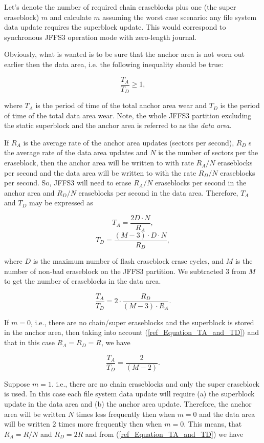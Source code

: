 \documentclass[12pt,a4paper,oneside,titlepage]{article}
\begin{document}
Let's denote the number of required chain eraseblocks plus one (the super
eraseblock) $m$ and calculate $m$ assuming the worst case scenario: any
file system data update requires the superblock update. This would correspond
to synchronous JFFS3 operation mode with \mbox{zero-length} journal.

Obviously, what is wanted is to be sure that the anchor area is not worn out
earlier then the data area, i.e. the following inequality should be true:

\begin{equation}
\frac{T_A}{T_D} \geqslant 1,
\label{ref_EquationSBIneq}
\end{equation}

where $T_A$ is the period of time of the total anchor area wear and $T_D$ is
the period of time of the total data area wear. Note, the whole JFFS3 partition
excluding the static superblock and the anchor area is referred to as the
\emph{data area}.

If $R_A$ is the average rate of the anchor area updates (sectors per second),
$R_D$ s the average rate of the data area updates and $N$ is the number of
sectors per the eraseblock, then the anchor area will be written to with rate
$R_A/N$ eraseblocks per second and the data area will be written to with the
rate $R_D/N$ eraseblocks per second. So, JFFS3 will need to erase $R_A/N$
eraseblocks per second in the anchor area and $R_D/N$ eraseblocks per second in
the data area. Therefore, $T_A$ and $T_D$ may be expressed as

$$
T_A = \frac{2D \cdot N}{R_A},
$$
$$
T_D = \frac{(M-3) \cdot D \cdot N}{R_D},
$$

where $D$ is the maximum number of flash eraseblock erase cycles, and $M$ is
the number of non-bad eraseblock on the JFFS3 partition. We subtracted 3 from
$M$ to get the number of eraseblocks in the data area.

\begin{equation}
\frac{T_A}{T_D} = 2 \cdot \frac{R_D}{(M-3) \cdot R_A}.
\label{ref_Equation_TA_and_TD}
\end{equation}

If $m = 0$, i.e., there are no chain/super eraseblocks and the superblock is
stored in the anchor area, then taking into account
(\ref{ref_Equation_TA_and_TD}) and that in this case $R_A = R_D = R$, we have

$$
\frac{T_A}{T_D} = \frac{2}{(M-2)}.
$$

Suppose $m = 1$. i.e., there are no chain eraseblocks and only the super
eraseblock is used. In this case each file system data update will require (a)
the superblock update in the data area and (b) the anchor area update.
Therefore, the anchor area will be written $N$ times less frequently then when
$m = 0$ and the data area will be written $2$ times more frequently then when
$m = 0$. This means, that $R_A = R/N$ and $R_D = 2R$ and from
(\ref{ref_Equation_TA_and_TD}) we have
\end{document}
